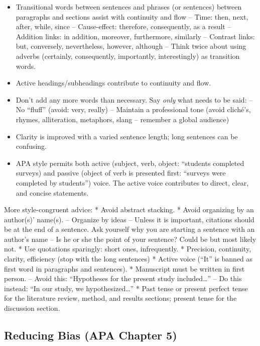 \documentclass[
  11pt,
]{book}
\providecommand{\tightlist}{%
  \setlength{\itemsep}{0pt}\setlength{\parskip}{0pt}}
\begin{document}
\begin{itemize}
\tightlist
\item
  Transitional words between sentences and phrases (or sentences) between paragraphs and sections assist with continuity and flow
  -- Time: then, next, after, while, since
  -- Cause-effect: therefore, consequently, as a result
  -- Addition links: in addition, moreover, furthermore, similarly
  -- Contrast links: but, conversely, nevertheless, however, although
  -- Think twice about using adverbs (certainly, consequently, importantly, interestingly) as transition words.
\item
  Active headings/subheadings contribute to continuity and flow.
\item
  Don't add any more words than necessary. Say \emph{only} what needs to be said:
  -- No ``fluff'' (avoid: very, really)
  -- Maintain a professional tone (avoid cliché's, rhymes, alliteration, metaphors, slang -- remember a global audience)
\item
  Clarity is improved with a varied sentence length; long sentences can be confusing.
\item
  APA style permits both active (subject, verb, object: ``students completed surveys) and passive (object of verb is presented first: ``surveys were completed by students'') voice. The active voice contributes to direct, clear, and concise statements.
\end{itemize}

More style-congruent advice:
* Avoid abstract stacking.
* Avoid organizing by an author(s)' name(s).
-- Organize by ideas -- Unless it is important, citations should be at the end of a sentence. Ask yourself why you are starting a sentence with an author's name -- Is he or she the point of your sentence? Could be but most likely not.
* Use quotations sparingly: short ones, infrequently.
* Precision, continuity, clarity, efficiency (stop with the long sentences)
* Active voice (``It'' is banned as first word in paragraphs and sentences).
* Manuscript must be written in first person.
-- Avoid this: ``Hypotheses for the present study included\ldots{}''
-- Do this instead: ``In our study, we hypothesized\ldots{}''
* Past tense or present perfect tense for the literature review, method, and results sections; present tense for the discussion section.

\hypertarget{reducing-bias-apa-chapter-5}{%
\subsection{Reducing Bias (APA Chapter 5)}\label{reducing-bias-apa-chapter-5}}
\end{document}
